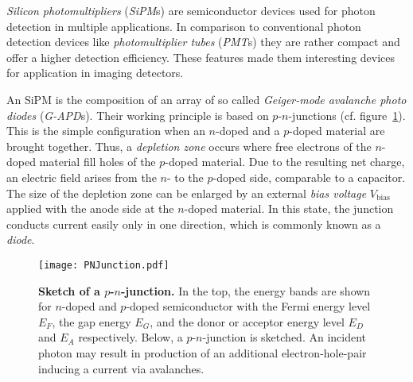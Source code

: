 \textit{Silicon photomultipliers} (\textit{SiPM}s) are semiconductor devices used for photon detection in multiple applications. In comparison to conventional photon detection devices like \textit{photomultiplier tubes} (\textit{PMT}s) they are rather compact and offer a higher detection efficiency. These features made them interesting devices for application in imaging detectors.

An SiPM is the composition of an array of so called \textit{Geiger-mode avalanche photo diodes} (\mbox{\textit{G-APD}s}). Their working principle is based on $p$-$n$-junctions (cf. figure~\ref{sipm:pn_junction}). This is the simple configuration when an $n$-doped and a $p$-doped material are brought together. Thus, a \textit{depletion zone} occurs where free electrons of the $n$-doped material fill holes of the $p$-doped material. Due to the resulting net charge, an electric field arises from the $n$- to the $p$-doped side, comparable to a capacitor. The size of the depletion zone can be enlarged by an external \textit{bias voltage} $V_\text{bias}$ applied with the anode side at the $n$-doped material. In this state, the junction conducts current easily only in one direction, which is commonly known as a \textit{diode}. \cite{pn:simon}

\begin{figure}[H]
	\centering
	\texttt{[image: PNJunction.pdf]}
	\caption[Sketch of a $p$-$n$-junction]{\textbf{Sketch of a $p$-$n$-junction.} \cite{iceact:camera} In the top, the energy bands are shown for $n$-doped and $p$-doped semiconductor with the Fermi energy level $E_F$, the gap energy $E_G$, and the donor or acceptor energy level $E_D$ and $E_A$ respectively. Below, a $p$-$n$-junction is sketched. An incident photon may result in production of an additional electron-hole-pair inducing a current via avalanches.}
	\label{sipm:pn_junction}	
\end{figure}

